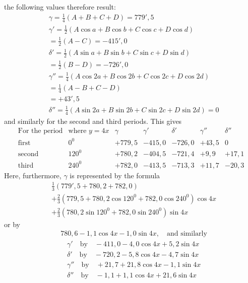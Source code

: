 the following values therefore result:
\[
\begin{aligned}
&\gamma=\tfrac14(A+B+C+D)=779'{,}5\\[5pt]
&\gamma'=\tfrac12(A\cos a+B\cos b+C\cos c+D\cos d)\\[5pt]
&=\tfrac12(A-C)=-415'{,}0\\[5pt]
&\delta'=\tfrac12(A\sin a+B\sin b+C\sin c+D\sin d)\\[5pt]
&=\tfrac12(B-D)=-726'{,}0\\[5pt]
&\gamma''=\tfrac14(A\cos2a+B\cos2b+C\cos2c+D\cos2d)\\[5pt]
&=\tfrac14(A-B+C-D)\\[5pt]
&=+43'{,}5\\[5pt]
&\delta''=\tfrac14(A\sin2a+B\sin2b+C\sin2c+D\sin2d)=0
\end{aligned}
\]
and similarly for the second and third periods. This gives
{\small\setlength{\arraycolsep}{3pt}\[
\begin{array}{l|r|r|r|r|r|r}
\text{For the period}&\text{where }y=4x&\gamma&\gamma'&\delta'&\gamma''&\delta''\\ \hline
\text{first}&0^{\mathord{0}}&+779{,}5&-415{,}0&-726{,}0&+43{,}5&0\\
\text{second}&120^{\mathord{0}}&+780{,}2&-404{,}5&-721{,}4&+9{,}9&+17{,}1\\
\text{third}&240^{\mathord{0}}&+782{,}0&-413{,}5&-713{,}3&+11{,}7&-20{,}3
\end{array}
\]}
Here, furthermore, $\gamma$ is represented by the formula
\[
\begin{aligned}
&\tfrac13(779'{,}5+780{,}2+782{,}0)\\[5pt]
&+\tfrac23(779{,}5+780{,}2\cos120^{\mathord{0}}+782{,}0\cos240^{\mathord{0}})\cos4x\\[5pt]
&+\tfrac23(780{,}2\sin120^{\mathord{0}}+782{,}0\sin240^{\mathord{0}})\sin4x
\end{aligned}
\]
or by
\[
\begin{aligned}
&780{,}6-1{,}1\cos4x-1{,}0\sin4x,\quad\text{and similarly}
\end{aligned}
\]
\[
\begin{aligned}
&\gamma'\quad\text{by}\quad-411{,}0-4{,}0\cos4x+5{,}2\sin4x\\[5pt]
&\delta'\quad\text{by}\quad-720{,}2-5{,}8\cos4x-4{,}7\sin4x\\[5pt]
&\gamma''\quad\text{by}\quad+21{,}7+21{,}8\cos4x-1{,}1\sin4x\\[5pt]
&\delta''\quad\text{by}\quad-1{,}1+1{,}1\cos4x+21{,}6\sin4x
\end{aligned}
\]
